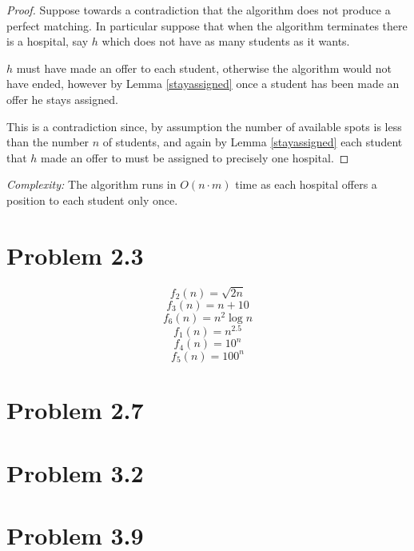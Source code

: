 \documentclass{article}
\begin{document}
\begin{proof}
Suppose towards a contradiction that the algorithm does not produce a perfect matching. In particular suppose that when the algorithm terminates there is a hospital, say $h$ which does not have as many students as it wants.

$h$ must have made an offer to each student, otherwise the algorithm would not have ended, however by Lemma \ref{stayassigned} once a student has been made an offer he stays assigned.

This is a contradiction since, by assumption the number of available spots is less than the number $n$ of students, and again by Lemma \ref{stayassigned} each student that $h$ made an offer to must be assigned to precisely one hospital.
\end{proof}

\emph{Complexity:} The algorithm runs in $O(n \cdot m)$ time as each hospital offers a position to each student only once.

\section{Problem 2.3}

\[f_2(n)=\sqrt{2 n}\]
\[f_3(n)=n+10\]
\[f_6(n)=n^2 \log{n}\]
\[f_1(n)=n^{2.5}\]
\[f_4(n)=10^n\]
\[f_5(n)=100^n\]

\section{Problem 2.7}
\section{Problem 3.2}
\section{Problem 3.9}
\end{document}
